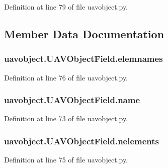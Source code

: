Definition at line 79 of file uavobject.\-py.



\subsection{Member Data Documentation}
\hypertarget{classuavobject_1_1_u_a_v_object_field_a811dd2d5039fa7abbd22558619c2b363}{
\subsubsection[{elemnames}]{\setlength{\rightskip}{0pt plus 5cm}uavobject.\-U\-A\-V\-Object\-Field.\-elemnames}}\label{classuavobject_1_1_u_a_v_object_field_a811dd2d5039fa7abbd22558619c2b363}


Definition at line 76 of file uavobject.\-py.

\hypertarget{classuavobject_1_1_u_a_v_object_field_a9b3f1adb03ed4293915011faf9ed93a9}{
\subsubsection[{name}]{\setlength{\rightskip}{0pt plus 5cm}uavobject.\-U\-A\-V\-Object\-Field.\-name}}\label{classuavobject_1_1_u_a_v_object_field_a9b3f1adb03ed4293915011faf9ed93a9}


Definition at line 73 of file uavobject.\-py.

\hypertarget{classuavobject_1_1_u_a_v_object_field_a1041dbb74c1678d16fba30515fb1f47c}{
\subsubsection[{nelements}]{\setlength{\rightskip}{0pt plus 5cm}uavobject.\-U\-A\-V\-Object\-Field.\-nelements}}\label{classuavobject_1_1_u_a_v_object_field_a1041dbb74c1678d16fba30515fb1f47c}


Definition at line 75 of file uavobject.\-py.

